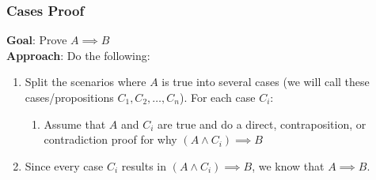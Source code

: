 \documentclass{beamer}
\begin{document}
\begin{frame}
\frametitle{Cases Proof}
{\bf Goal}: Prove $A\implies B$\\
{\bf Approach}: Do the following:
\begin{enumerate}
    \item Split the scenarios where $A$ is true into several cases (we will call these cases/propositions $C_1,C_2,\dots,C_n$). For each case $C_i$:
    \begin{enumerate}
        \item Assume that $A$ and $C_i$ are true and do a direct, contraposition, or contradiction proof for why $(A\wedge C_i)\implies B$
    \end{enumerate}
    \item Since every case $C_i$ results in $(A\wedge C_i)\implies B$, we know that $A\implies B$.
\end{enumerate}
\end{frame}
\end{document}
